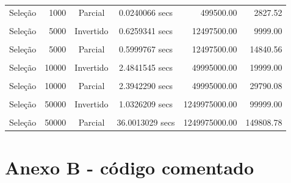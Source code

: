 \documentclass[
]{article}
\begin{document}
\begin{longtable}[l]{lrccrr}
Seleção & 1000 & Parcial & 0.0240066 secs & 499500.00 & 2827.52\\
\cellcolor{gray!15}{Seleção} & \cellcolor{gray!15}{5000} & \cellcolor{gray!15}{Aleatório} & \cellcolor{gray!15}{0.5993001 secs} & \cellcolor{gray!15}{12497500.00} & \cellcolor{gray!15}{14980.26}\\
Seleção & 5000 & Invertido & 0.6259341 secs & 12497500.00 & 9999.00\\
\cellcolor{gray!15}{Seleção} & \cellcolor{gray!15}{5000} & \cellcolor{gray!15}{Ordenado} & \cellcolor{gray!15}{0.5981762 secs} & \cellcolor{gray!15}{12497500.00} & \cellcolor{gray!15}{4999.00}\\
Seleção & 5000 & Parcial & 0.5999767 secs & 12497500.00 & 14840.56\\
\cellcolor{gray!15}{Seleção} & \cellcolor{gray!15}{10000} & \cellcolor{gray!15}{Aleatório} & \cellcolor{gray!15}{2.3946125 secs} & \cellcolor{gray!15}{49995000.00} & \cellcolor{gray!15}{29979.50}\\
Seleção & 10000 & Invertido & 2.4841545 secs & 49995000.00 & 19999.00\\
\cellcolor{gray!15}{Seleção} & \cellcolor{gray!15}{10000} & \cellcolor{gray!15}{Ordenado} & \cellcolor{gray!15}{2.3931191 secs} & \cellcolor{gray!15}{49995000.00} & \cellcolor{gray!15}{9999.00}\\
Seleção & 10000 & Parcial & 2.3942290 secs & 49995000.00 & 29790.08\\
\cellcolor{gray!15}{Seleção} & \cellcolor{gray!15}{50000} & \cellcolor{gray!15}{Aleatório} & \cellcolor{gray!15}{40.1216324 secs} & \cellcolor{gray!15}{1249975000.00} & \cellcolor{gray!15}{149976.26}\\
Seleção & 50000 & Invertido & 1.0326209 secs & 1249975000.00 & 99999.00\\
\cellcolor{gray!15}{Seleção} & \cellcolor{gray!15}{50000} & \cellcolor{gray!15}{Ordenado} & \cellcolor{gray!15}{59.9039979 secs} & \cellcolor{gray!15}{1249975000.00} & \cellcolor{gray!15}{49999.00}\\
Seleção & 50000 & Parcial & 36.0013029 secs & 1249975000.00 & 149808.78\\*
\end{longtable}

\newpage

\hypertarget{anexo-b---cuxf3digo-comentado}{%
\section*{Anexo B - código
comentado}\label{anexo-b---cuxf3digo-comentado}}
\end{document}
